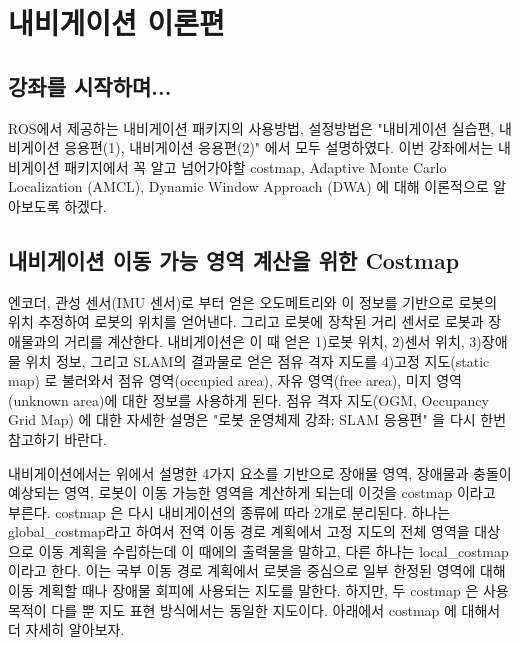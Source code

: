 \section{내비게이션 이론편}
\label{sec:NavigationExeTheory}

\subsection{강좌를 시작하며...}

ROS에서 제공하는 내비게이션 패키지의 사용방법, 설정방법은 "내비게이션 실습편, 내비게이션 응용편(1), 내비게이션 응용편(2)" 에서 모두 설명하였다. 이번 강좌에서는 내비게이션 패키지에서 꼭 알고 넘어가야할 costmap, Adaptive Monte Carlo Localization (AMCL), Dynamic Window Approach (DWA) 에 대해 이론적으로 알아보도록 하겠다.

\subsection{내비게이션 이동 가능 영역 계산을 위한 Costmap}

엔코더, 관성 센서(IMU 센서)로 부터 얻은 오도메트리와 이 정보를 기반으로 로봇의 위치 추정하여 로봇의 위치를 얻어낸다. 그리고 로봇에 장착된 거리 센서로 로봇과 장애물과의 거리를 계산한다. 내비게이션은 이 때 얻은 1)로봇 위치, 2)센서 위치, 3)장애물 위치 정보, 그리고 SLAM의 결과물로 얻은 점유 격자 지도를 4)고정 지도(static map) 로 불러와서 점유 영역(occupied area), 자유 영역(free area), 미지 영역(unknown area)에 대한 정보를 사용하게 된다. 점유 격자 지도(OGM, Occupancy Grid Map) 에 대한 자세한 설명은 "로봇 운영체제 강좌: SLAM 응용편" 을 다시 한번 참고하기 바란다.

내비게이션에서는 위에서 설명한 4가지 요소를 기반으로 장애물 영역, 장애물과 충돌이 예상되는 영역, 로봇이 이동 가능한 영역을 계산하게 되는데 이것을 costmap 이라고 부른다. costmap 은 다시 내비게이션의 종류에 따라 2개로 분리된다. 하나는 global\_costmap라고 하여서 전역 이동 경로 계획에서 고정 지도의 전체 영역을 대상으로 이동 계획을 수립하는데 이 때에의 출력물을 말하고, 다른 하나는 local\_costmap 이라고 한다. 이는 국부 이동 경로 계획에서 로봇을 중심으로 일부 한정된 영역에 대해 이동 계획할 때나 장애물 회피에 사용되는 지도를 말한다. 하지만, 두 costmap 은 사용 목적이 다를 뿐 지도 표현 방식에서는 동일한 지도이다. 아래에서 costmap 에 대해서 더 자세히 알아보자.

